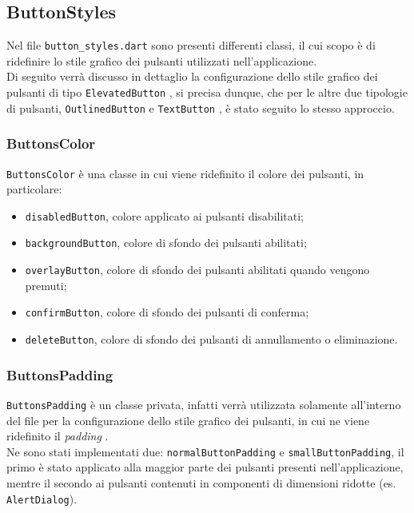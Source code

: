 \subsection{ButtonStyles}
\label{subsec:button-styles}

Nel file \lstinline{button_styles.dart} sono presenti differenti classi, il cui scopo è di ridefinire lo stile grafico dei pulsanti utilizzati nell'applicazione. \\
Di seguito verrà discusso in dettaglio la configurazione dello stile grafico dei pulsanti di tipo \lstinline{ElevatedButton} \cite{site:elevated-button}, si precisa dunque, che per le altre due tipologie di pulsanti, \lstinline{OutlinedButton} \cite{site:outline-button} e \lstinline{TextButton} \cite{site:text-button}, è stato seguito lo stesso approccio.

\subsubsection*{ButtonsColor}
\label{subsubsec:button-color}

\lstinline{ButtonsColor} è una classe in cui viene ridefinito il colore dei pulsanti, in particolare:
\begin{itemize}
    \item \lstinline{disabledButton}, colore applicato ai pulsanti disabilitati;
    \item \lstinline{backgroundButton}, colore di sfondo dei pulsanti abilitati;
    \item \lstinline{overlayButton}, colore di sfondo dei pulsanti abilitati quando vengono premuti;
    \item \lstinline{confirmButton}, colore di sfondo dei pulsanti di conferma;
    \item \lstinline{deleteButton}, colore di sfondo dei pulsanti di annullamento o eliminazione.
\end{itemize}

\subsubsection*{ButtonsPadding}
\label{subsubsec:button-padding}

\lstinline{ButtonsPadding} è un classe privata, infatti verrà utilizzata solamente all'interno del file per la configurazione dello stile grafico dei pulsanti, in cui ne viene ridefinito il \emph{padding} \cite{site:padding}. \\
Ne sono stati implementati due: \lstinline{normalButtonPadding} e \lstinline{smallButtonPadding}, il primo è stato applicato alla maggior parte dei pulsanti presenti nell'applicazione, mentre il secondo ai pulsanti contenuti in componenti di dimensioni ridotte (es. \lstinline{AlertDialog}).

